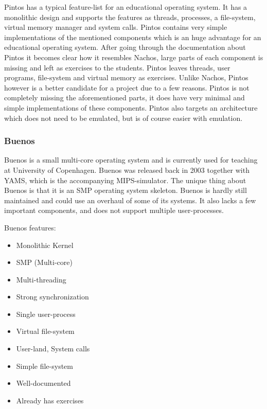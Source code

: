 Pintos has a typical feature-list for an educational operating system. It has a monolithic design and supports the features as threads, processes, a file-system, virtual memory manager and system calls. Pintos contains very simple implementations of the mentioned components which is an huge advantage for an educational operating system.
After going through the documentation about Pintos it becomes clear how it resembles Nachos, large parts of each component is missing and left as exercises to the students. Pintos leaves threads, user programs, file-system and virtual memory as exercises. Unlike Nachos, Pintos however is a better candidate for a project due to a few reasons. Pintos is not completely missing the aforementioned parts, it does have very minimal and simple implementations of these components. Pintos also targets an architecture which does not need to be emulated, but is of course easier with emulation.

\subsubsection{Buenos}

Buenos is a small multi-core operating system and is currently used for teaching at University of Copenhagen. Buenos was released back in 2003 together with YAMS, which is the accompanying MIPS-simulator. The unique thing about Buenos is that it is an SMP operating system skeleton. Buenos is hardly still maintained and could use an overhaul of some of its systems. It also lacks a few important components, and does not support multiple user-processes.

Buenos features\cite{BuenosRef}:

\begin{itemize}
  \item Monolithic Kernel
  \item SMP (Multi-core)
  \item Multi-threading
  \item Strong synchronization
  \item Single user-process
  \item Virtual file-system
  \item User-land, System calls
  \item Simple file-system
  \item Well-documented
  \item Already has exercises
\end{itemize}

